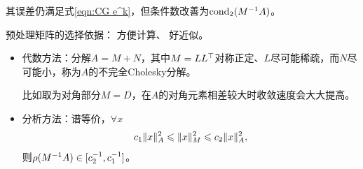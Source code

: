 \begin{corollary}
    其误差仍满足式\eqref{eqn:CG e^k}，但条件数改善为$\operatorname{cond}_2(M^{-1} A)$。
\end{corollary}

\begin{remark}
    预处理矩阵的选择依据：
    方便计算、
    好近似。
    \begin{itemize}
        \item 代数方法：分解$A = M + N$，其中$M = LL^\top$对称正定、$L$尽可能稀疏，而$N$尽可能小，称为$A$的不完全Cholesky分解。

        比如取为对角部分$M = D$，在$A$的对角元素相差较大时收敛速度会大大提高。
        \item 分析方法：谱等价，$\forall x$
        \begin{equation}\label{eq:na-spectral-equivalence}
            c_1\lVert x\rVert_A^2 \leqslant \lVert x\rVert_M^2 \leqslant c_2\lVert x\rVert_A^2,
        \end{equation}
        则$\rho(M^{-1} A) \in [c_2^{-1},c_1^{-1}]$。
    \end{itemize}
\end{remark}
